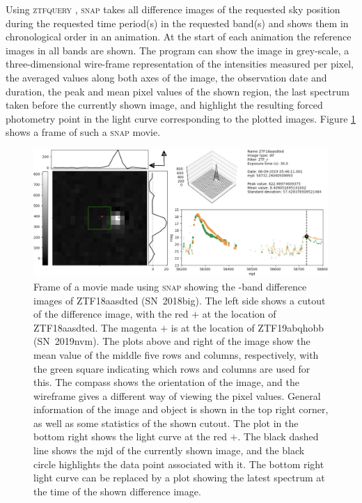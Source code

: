 \documentclass[a4paper,oneside,12pt, class=Latex/Classes/PhDthesisPSnPDF, crop=false]{standalone}
\begin{document}
Using \textsc{ztfquery} \citep{ZTFquery}, \textsc{snap} takes all difference images of the requested sky position during the requested time period(s) in the requested band(s) and shows them in chronological order in an animation. At the start of each animation the reference images in all bands are shown. The program can show the image in grey-scale, a three-dimensional wire-frame representation of the intensities measured per pixel, the averaged values along both axes of the image, the observation date and duration, the peak and mean pixel values of the shown region, the last spectrum taken before the currently shown image, and highlight the resulting forced photometry point in the light curve corresponding to the plotted images. Figure \ref{snap_showcase} shows a frame of such a \textsc{snap} movie.\\

\begin{figure}
 \centering
 \includegraphics[width=\textwidth]{../Images/chapter_3/snap_showcase.png}
 \caption{Frame of a movie made using \textsc{snap} showing the \ztfr-band difference images of ZTF18aasdted (SN~2018big). The left side shows a cutout of the difference image, with the red $\plus$ at the location of ZTF18aasdted. The magenta $\plus$ is at the location of ZTF19abqhobb (SN~2019nvm). The plots above and right of the image show the mean value of the middle five rows and columns, respectively, with the green square indicating which rows and columns are used for this. The compass shows the orientation of the image, and the wireframe gives a different way of viewing the pixel values. General information of the image and object is shown in the top right corner, as well as some statistics of the shown cutout. The plot in the bottom right shows the light curve at the red $\plus$. The black dashed line shows the mjd of the currently shown image, and the black circle highlights the data point associated with it. The bottom right light curve can be replaced by a plot showing the latest spectrum at the time of the shown difference image.}
 \label{snap_showcase}
\end{figure}
\end{document}
